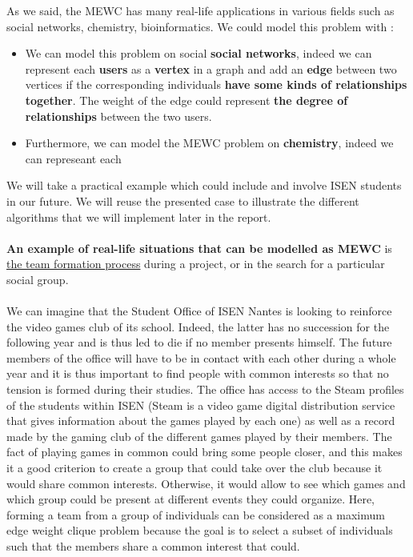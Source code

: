     As we said, the MEWC has many real-life applications in various fields such as social networks, chemistry, bioinformatics. We could model this problem with :
    \begin{itemize}
        \item We can model this problem on social \textbf{social networks}, indeed we can represent each \textbf{users} as a \textbf{vertex} in a graph and add an \textbf{edge} between two vertices if the corresponding individuals \textbf{have some kinds of relationships together}. The weight of the edge could represent \textbf{the degree of relationships} between the two users.
        \item Furthermore, we can model the MEWC problem on \textbf{chemistry}, indeed we can represeant each \textbf{} 
    \end{itemize}
    We will take a practical example which could include and involve ISEN students in our future. We will reuse the presented case to illustrate the different algorithms that we will implement later in the report.\\ \\
    \textbf{An example of real-life situations that can be modelled as MEWC} is \underline{the team formation process} during a project, or in the search for a particular social group. 
    \\ \\
    We can imagine that the Student Office of ISEN Nantes is looking to reinforce the video games club of its school. Indeed, the latter has no succession for the following year and is thus led to die if no member presents himself. The future members of the office will have to be in contact with each other during a whole year and it is thus important to find people with common interests so that no tension is formed during their studies. The office has access to the Steam profiles of the students within ISEN (Steam is a video game digital distribution service that gives information about the games played by each one) as well as a record made by the gaming club of the different games played by their members. The fact of playing games in common could bring some people closer, and this makes it a good criterion to create a group that could take over the club because it would share common interests. Otherwise, it would allow to see which games and which group could be present at different events they could organize. Here, forming a team from a group of individuals can be considered as a maximum edge weight clique problem because the goal is to select a subset of individuals such that the members share a common interest that could.

